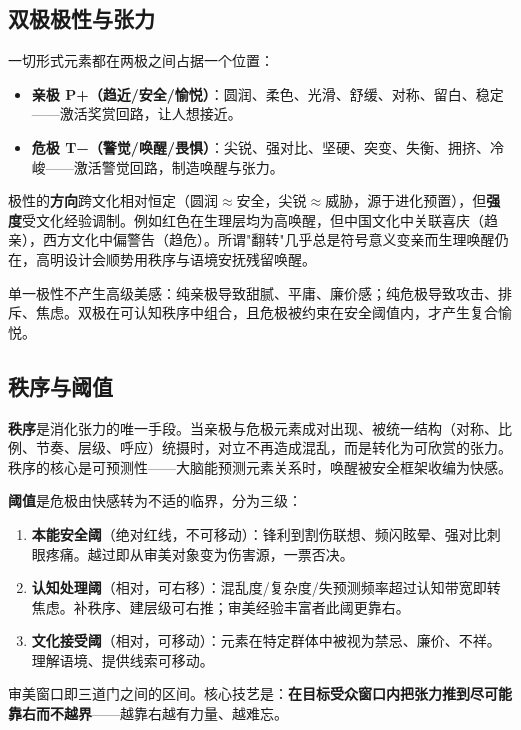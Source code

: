 \documentclass[10pt,a4paper]{article}
\begin{document}
\subsection{双极极性与张力}

一切形式元素都在两极之间占据一个位置：

\begin{itemize}[leftmargin=*]
\item \textbf{亲极 P+（趋近/安全/愉悦）}：圆润、柔色、光滑、舒缓、对称、留白、稳定——激活奖赏回路，让人想接近。
\item \textbf{危极 T−（警觉/唤醒/畏惧）}：尖锐、强对比、坚硬、突变、失衡、拥挤、冷峻——激活警觉回路，制造唤醒与张力。
\end{itemize}

极性的\textbf{方向}跨文化相对恒定（圆润$\approx$安全，尖锐$\approx$威胁，源于进化预置），但\textbf{强度}受文化经验调制。例如红色在生理层均为高唤醒，但中国文化中关联喜庆（趋亲），西方文化中偏警告（趋危）。所谓"翻转"几乎总是符号意义变亲而生理唤醒仍在，高明设计会顺势用秩序与语境安抚残留唤醒。

单一极性不产生高级美感：纯亲极导致甜腻、平庸、廉价感；纯危极导致攻击、排斥、焦虑。双极在可认知秩序中组合，且危极被约束在安全阈值内，才产生复合愉悦。

\subsection{秩序与阈值}

\textbf{秩序}是消化张力的唯一手段。当亲极与危极元素成对出现、被统一结构（对称、比例、节奏、层级、呼应）统摄时，对立不再造成混乱，而是转化为可欣赏的张力。秩序的核心是可预测性——大脑能预测元素关系时，唤醒被安全框架收编为快感。

\textbf{阈值}是危极由快感转为不适的临界，分为三级：

\begin{enumerate}[leftmargin=*]
\item \textbf{本能安全阈}（绝对红线，不可移动）：锋利到割伤联想、频闪眩晕、强对比刺眼疼痛。越过即从审美对象变为伤害源，一票否决。
\item \textbf{认知处理阈}（相对，可右移）：混乱度/复杂度/失预测频率超过认知带宽即转焦虑。补秩序、建层级可右推；审美经验丰富者此阈更靠右。
\item \textbf{文化接受阈}（相对，可移动）：元素在特定群体中被视为禁忌、廉价、不祥。理解语境、提供线索可移动。
\end{enumerate}

审美窗口即三道门之间的区间。核心技艺是：\textbf{在目标受众窗口内把张力推到尽可能靠右而不越界}——越靠右越有力量、越难忘。
\end{document}
